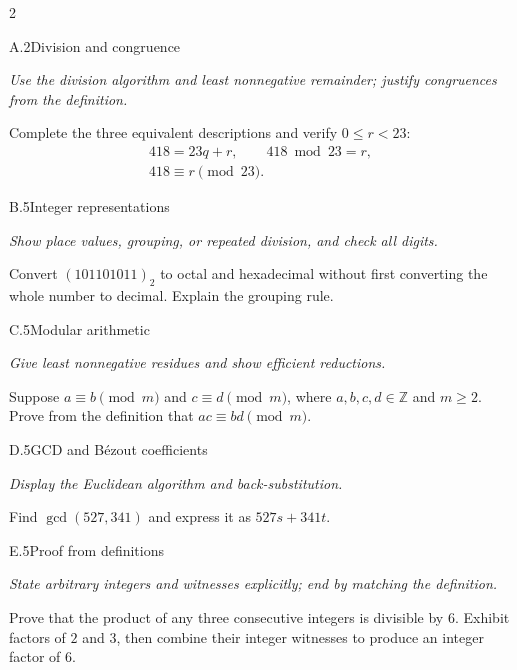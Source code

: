 \documentclass[9pt]{extarticle}
\begin{document}
\begin{multicols}{2}
\begin{CoreProblem}{A.2}{Division and congruence}
{\scriptsize\textit{Use the division algorithm and least nonnegative remainder; justify congruences from the definition.}\par}
Complete the three equivalent descriptions and verify $0\le r<23$:
\[
\begin{gathered}
418=23q+r,\qquad 418\bmod 23=r,\\
418\equiv r\pmod{23}.
\end{gathered}
\]
\end{CoreProblem}
\begin{CoreProblem}{B.5}{Integer representations}
{\scriptsize\textit{Show place values, grouping, or repeated division, and check all digits.}\par}
Convert $(101101011)_2$ to octal and hexadecimal without first converting the
whole number to decimal. Explain the grouping rule.
\end{CoreProblem}
\begin{CoreProblem}{C.5}{Modular arithmetic}
{\scriptsize\textit{Give least nonnegative residues and show efficient reductions.}\par}
Suppose $a\equiv b\pmod m$ and $c\equiv d\pmod m$, where
$a,b,c,d\in\mathbb Z$ and $m\ge2$. Prove from the definition that
$ac\equiv bd\pmod m$.
\end{CoreProblem}
\columnbreak
\begin{CoreProblem}{D.5}{GCD and B\'ezout coefficients}
{\scriptsize\textit{Display the Euclidean algorithm and back-substitution.}\par}
Find $\gcd(527,341)$ and express it as $527s+341t$.
\end{CoreProblem}
\begin{CoreProblem}{E.5}{Proof from definitions}
{\scriptsize\textit{State arbitrary integers and witnesses explicitly; end by matching the definition.}\par}
Prove that the product of any three consecutive integers is divisible by $6$.
Exhibit factors of $2$ and $3$, then combine their integer witnesses to
produce an integer factor of $6$.
\end{CoreProblem}
\end{multicols}
\CoreWorkArea
\FormBreak
{}
\end{document}
